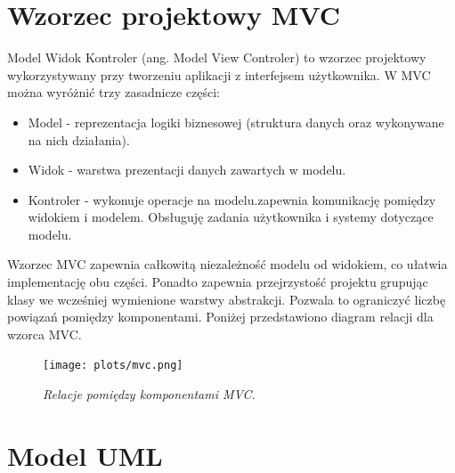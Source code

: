 \documentclass[eng,printmode]{mgr}
\begin{document}
\section{Wzorzec projektowy MVC}
Model Widok Kontroler (ang. Model View Controler) to wzorzec projektowy wykorzystywany przy tworzeniu aplikacji z interfejsem użytkownika. W MVC można wyróżnić trzy zasadnicze części:
\begin{itemize}
  \item Model - reprezentacja logiki biznesowej (struktura danych oraz wykonywane na nich działania).
  \item Widok - warstwa prezentacji danych zawartych w modelu.
  \item Kontroler - wykonuje operacje na modelu.zapewnia komunikację pomiędzy widokiem i modelem. Obsługuję zadania użytkownika i systemy dotyczące modelu.  
\end{itemize}

Wzorzec MVC zapewnia całkowitą niezależność modelu od widokiem, co ułatwia implementację obu części. Ponadto zapewnia przejrzystość projektu grupując klasy we wcześniej wymienione warstwy abstrakcji. Pozwala to ograniczyć liczbę powiązań pomiędzy komponentami. Poniżej przedstawiono diagram relacji dla wzorca MVC.


\begin{center}\centering
\vspace*{\fill}
\begin{figure}[!h]
    \centering
    \texttt{[image: plots/mvc.png]}
    \caption{\textit{\scriptsize Relacje pomiędzy komponentami MVC.}}
\end{figure}
\vfill
\end{center}

\section{Model UML}
\end{document}
